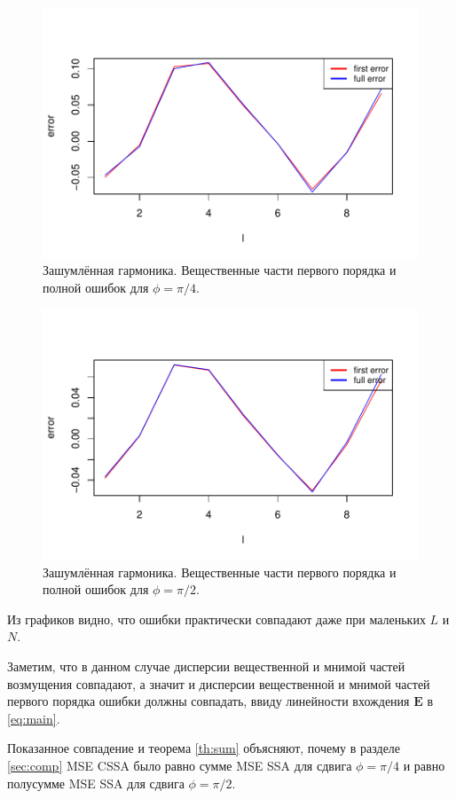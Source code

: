 \documentclass[specialist,
               substylefile = spbu.rtx,
               subf,href,colorlinks=true, 12pt]{disser}
\begin{document}
\begin{figure}[H]
	\begin{center}
		\includegraphics[width=0.6\linewidth]{img/first_vs_full_re.pdf}
		\caption{Зашумлённая гармоника. Вещественные части первого порядка и полной ошибок для $\phi = \pi / 4$.}
		\label{fig:harm_noise_pi_4}
	\end{center}
\end{figure}

\begin{figure}[H]
	\begin{center}
		\includegraphics[width=0.6\linewidth]{img/first_vs_full_re_2.pdf}
		\caption{Зашумлённая гармоника. Вещественные части первого порядка и полной ошибок для $\phi = \pi / 2$.}
		\label{fig:harm_noise_pi_2}
	\end{center}
\end{figure}


Из графиков видно, что ошибки практически совпадают даже при маленьких $L$ и $N$.

Заметим, что в данном случае дисперсии вещественной и мнимой частей возмущения совпадают, а значит и дисперсии вещественной и мнимой частей первого порядка ошибки должны совпадать, ввиду линейности вхождения $\mathbf{E}$ в \eqref{eq:main}.

Показанное совпадение и теорема \ref{th:sum} объясняют, почему в разделе \ref{sec:comp} MSE CSSA было равно сумме MSE SSA для сдвига $\phi = \pi/4$ и равно полусумме MSE SSA для сдвига $\phi = \pi/2$.
\end{document}
